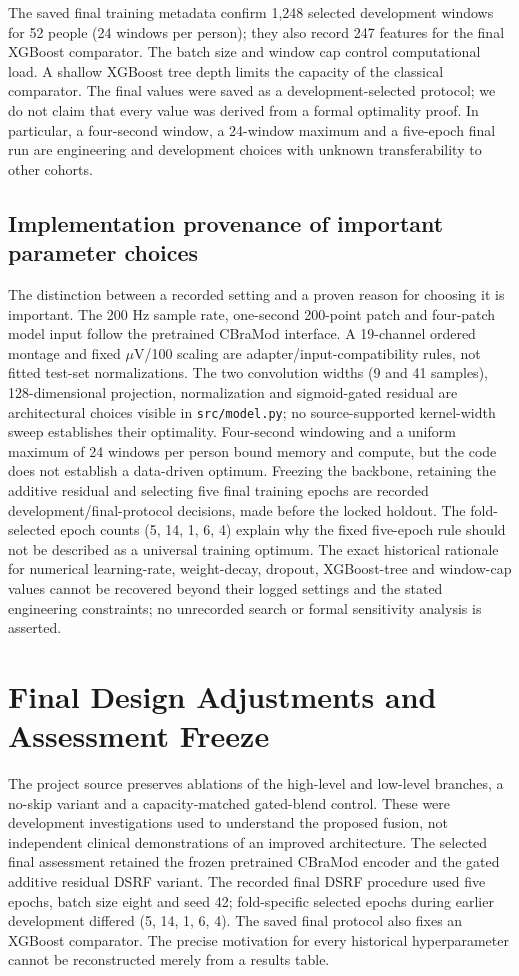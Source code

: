 The saved final training metadata confirm 1,248 selected development windows for 52 people (24 windows per person); they also record 247 features for the final XGBoost comparator. The batch size and window cap control computational load. A shallow XGBoost tree depth limits the capacity of the classical comparator. The final values were saved as a development-selected protocol; we do not claim that every value was derived from a formal optimality proof. In particular, a four-second window, a 24-window maximum and a five-epoch final run are engineering and development choices with unknown transferability to other cohorts.

\subsection{Implementation provenance of important parameter choices}
The distinction between a recorded setting and a proven reason for choosing it is important. The 200 Hz sample rate, one-second 200-point patch and four-patch model input follow the pretrained CBraMod interface. A 19-channel ordered montage and fixed $\mu$V/100 scaling are adapter/input-compatibility rules, not fitted test-set normalizations. The two convolution widths (9 and 41 samples), 128-dimensional projection, normalization and sigmoid-gated residual are architectural choices visible in \texttt{src/model.py}; no source-supported kernel-width sweep establishes their optimality. Four-second windowing and a uniform maximum of 24 windows per person bound memory and compute, but the code does not establish a data-driven optimum. Freezing the backbone, retaining the additive residual and selecting five final training epochs are recorded development/final-protocol decisions, made before the locked holdout. The fold-selected epoch counts (5, 14, 1, 6, 4) explain why the fixed five-epoch rule should not be described as a universal training optimum. The exact historical rationale for numerical learning-rate, weight-decay, dropout, XGBoost-tree and window-cap values cannot be recovered beyond their logged settings and the stated engineering constraints; no unrecorded search or formal sensitivity analysis is asserted.

\section{Final Design Adjustments and Assessment Freeze}
The project source preserves ablations of the high-level and low-level branches, a no-skip variant and a capacity-matched gated-blend control. These were development investigations used to understand the proposed fusion, not independent clinical demonstrations of an improved architecture. The selected final assessment retained the frozen pretrained CBraMod encoder and the gated additive residual DSRF variant. The recorded final DSRF procedure used five epochs, batch size eight and seed 42; fold-specific selected epochs during earlier development differed (5, 14, 1, 6, 4). The saved final protocol also fixes an XGBoost comparator. The precise motivation for every historical hyperparameter cannot be reconstructed merely from a results table.

